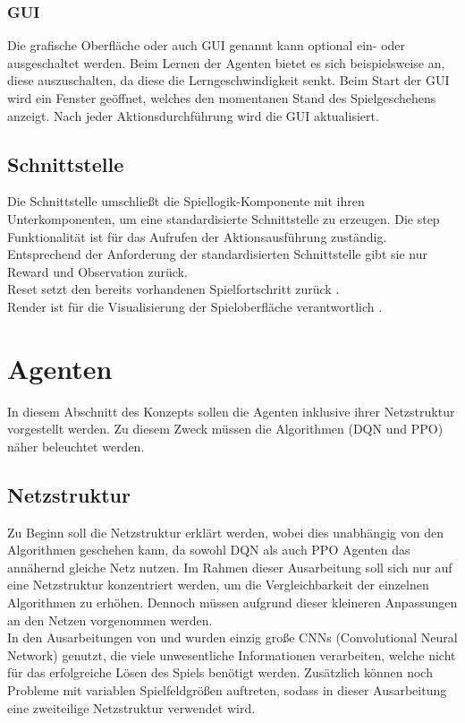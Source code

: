 \subsubsection{GUI} \label{susubsec:Konzept_GUI}
Die grafische Oberfläche oder auch GUI genannt kann optional ein- oder ausgeschaltet werden. Beim Lernen der Agenten bietet es sich beispielsweise an, diese auszuschalten, da diese die Lerngeschwindigkeit senkt. Beim Start der GUI wird ein Fenster geöffnet, welches den momentanen Stand des Spielgeschehens anzeigt. Nach jeder Aktionsdurchführung wird die GUI aktualisiert.

\subsection{Schnittstelle} \label{subsec:Konzept_Schnittstelle}
Die Schnittstelle umschließt die Spiellogik-Komponente mit ihren Unterkomponenten, um eine standardisierte Schnittstelle zu erzeugen.
Die step Funktionalität ist für das Aufrufen der Aktionsausführung zuständig. Entsprechend der Anforderung der standardisierten Schnittstelle  gibt sie nur Reward und Observation zurück.\\
Reset setzt den bereits vorhandenen Spielfortschritt zurück .\\
Render ist für die Visualisierung der Spieloberfläche verantwortlich .

\section{Agenten} \label{sec:Konzept_Agenten}
In diesem Abschnitt des Konzepts sollen die Agenten inklusive ihrer Netzstruktur vorgestellt werden. Zu diesem Zweck müssen die Algorithmen (DQN und PPO) näher beleuchtet werden.

\subsection{Netzstruktur} \label{subsec:Konzept_Netzstruktur}
Zu Beginn soll die Netzstruktur erklärt werden, wobei dies unabhängig von den Algorithmen geschehen kann, da sowohl DQN als auch PPO Agenten das annähernd gleiche Netz nutzen.
Im Rahmen dieser Ausarbeitung soll sich nur auf eine Netzstruktur konzentriert werden, um die Vergleichbarkeit der einzelnen Algorithmen zu erhöhen. Dennoch müssen aufgrund dieser kleineren Anpassungen an den Netzen vorgenommen werden.\\
In den Ausarbeitungen von \citep{Autonomous_Agents_in_Snake_Game_via_DRL} und \citep{UAV} wurden einzig große CNNs (Convolutional Neural Network) genutzt, die viele unwesentliche Informationen verarbeiten, welche nicht für das erfolgreiche Lösen des Spiels benötigt werden. Zusätzlich können noch Probleme mit variablen Spielfeldgrößen auftreten, sodass in dieser Ausarbeitung eine zweiteilige Netzstruktur verwendet wird. 

